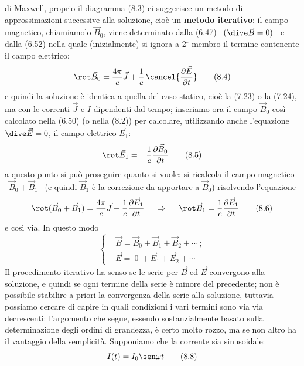 di Maxwell, proprio il diagramma (8.3) ci suggerisce un metodo di
approssimazioni successive alla soluzione, cio\`e un \textbf{metodo iterativo}:
il campo magnetico, chiamiamolo $\vec B_0$, viene determinato dalla (6.47)
\ $(\dive\vec B=0)$ \ e dalla (6.52) nella quale (inizialmente) si ignora a
2$^\circ$ membro il termine contenente il campo elettrico:
\begin{equation}
  \rot\vec B_0=\frac{4\pi}{c}\vec J
  +\frac{1}{c}\,\cancel{\frac{\partial\vec E}{\partial t}}
  \tag{8.4}
\end{equation}
e quindi la soluzione \`e identica a quella del caso statico, cio\`e la (7.23) o
la (7.24), ma con le correnti $\vec J$ e $I$ dipendenti dal tempo; inseriamo ora
il campo $\vec B_0$ cos\`i calcolato nella (6.50) \big(o nella (8.2)\big) per
calcolare, utilizzando anche l'equazione \ $\dive\vec E=0$, il campo elettrico
$\vec E_1$:
\begin{equation}
  \rot\vec E_1=-\frac{1}{c}\frac{\partial\vec B_0}{\partial t}
  \tag{8.5}
\end{equation}
a questo punto si pu\`o proseguire quanto si vuole: si ricalcola il campo
magnetico \ $\vec B_0+\vec B_1$ \ (e quindi $\vec B_1$ \`e la correzione da
apportare a $\vec B_0$) risolvendo l'equazione
\begin{equation}
  \rot(\vec B_0+\vec B_1)=\frac{4\pi}{c}\vec J
  +\frac{1}{c}\frac{\partial\vec E_1}{\partial t}
  \quad\ \Rightarrow\quad\ \rot\vec B_1
  =\frac{1}{c}\frac{\partial\vec E_1}{\partial t}
  \tag{8.6}
\end{equation}
e cos\`i via. In questo modo
\begin{equation}
  \left\{\begin{aligned}
    &\vec B=\vec B_0+\vec B_1+\vec B_2+\cdots\,;\\
    &\vec E=\ 0\ +\vec E_1+\vec E_2+\cdots
  \end{aligned}\right.
  \tag{8.7}
\end{equation}
Il procedimento iterativo ha senso se le serie per $\vec B$ ed $\vec E$
convergono alla soluzione, e quindi se ogni termine della serie \`e minore del
precedente; non \`e possibile stabilire a priori la convergenza della serie alla
soluzione, tuttavia possiamo cercare di capire in quali condizioni i vari
termini sono via via decrescenti: l'argomento che segue, essendo sostanzialmente
basato sulla determinazione degli ordini di grandezza, \`e certo molto rozzo, ma
se non altro ha il vantaggio della semplicit\`a. Supponiamo che la corrente sia
sinusoidale:
\begin{equation}
  I(t)=I_0\sen\omega t
  \tag{8.8}
\end{equation}
